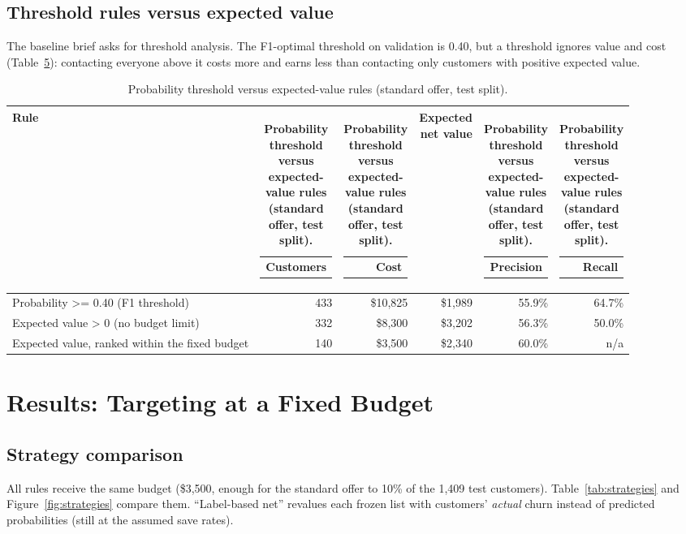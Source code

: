 \documentclass[11pt,a4paper]{article}
\makeatletter
\newcommand{\hd}[1]{\begin{tabular}[b]{@{}r@{}}\bfseries #1\end{tabular}}
\makeatother
\begin{document}
\subsection{Threshold rules versus expected value}

The baseline brief asks for threshold analysis. The F1-optimal threshold on validation is 0.40, but a threshold ignores value and cost (Table~\ref{tab:threshold}): contacting everyone above it costs more and earns less than contacting only customers with positive expected value.

\begin{table}[H]
\centering\small
\caption{Probability threshold versus expected-value rules (standard offer, test split).}\label{tab:threshold}
\begin{tabularx}{\linewidth}{@{}Lrrrrr@{}}
\toprule
\textbf{Rule} & \hd{Customers} & \hd{Cost} & \hd{Expected\\net value} & \hd{Precision} & \hd{Recall} \\
\midrule
Probability >= 0.40 (F1 threshold) & 433 & \$10,825 & \$1,989 & 55.9\% & 64.7\% \\
Expected value > 0 (no budget limit) & 332 & \$8,300 & \$3,202 & 56.3\% & 50.0\% \\
Expected value, ranked within the fixed budget & 140 & \$3,500 & \$2,340 & 60.0\% & n/a \\
\bottomrule
\end{tabularx}
\end{table}

\section{Results: Targeting at a Fixed Budget}

\subsection{Strategy comparison}

All rules receive the same budget (\$3,500, enough for the standard offer to 10\% of the 1,409 test customers). Table~\ref{tab:strategies} and Figure~\ref{fig:strategies} compare them. ``Label-based net'' revalues each frozen list with customers' \emph{actual} churn instead of predicted probabilities (still at the assumed save rates).
\end{document}
